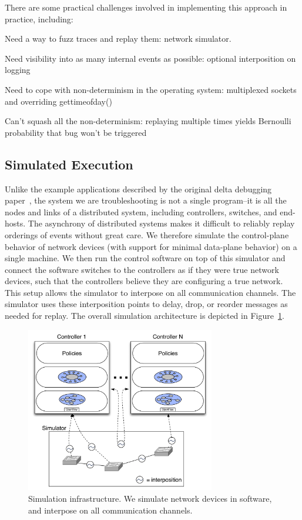 There are some practical challenges involved in implementing this approach in
practice, including:

\begin{outline}
\1 Need a way to fuzz traces and replay them: network simulator.

\1 Need visibility into as many internal events as possible: optional
interposition on logging

\1 Need to cope with non-determinism in the operating system: multiplexed sockets
and overriding gettimeofday()

\1 Can't squash all the non-determinism: replaying multiple times yields
Bernoulli probability that bug won't be triggered
\end{outline}

\subsection{Simulated Execution}
\label{subsec:simulation}

Unlike the example applications described
by the original delta debugging paper~\cite{Zeller:1999:YMP:318773.318946}, the system we are troubleshooting is not a
single program--it is all the nodes and links of a distributed system,
including controllers, switches, and end-hosts. The asynchrony of distributed
systems makes it difficult to reliably replay orderings of
events without great care. We therefore simulate the control-plane
behavior of network devices (with support for minimal data-plane behavior) on
a single machine. We then run the control software on
top of this simulator and connect the software switches to the controllers as if they were true
network devices, such that the controllers believe they are configuring a true
network. This setup allows the simulator to interpose on all communication
channels. The simulator uses these interposition points to delay, drop, or reorder
messages as needed for replay. The overall
simulation architecture is depicted in
Figure~\ref{fig:architecture}.

\begin{figure}[t]
    \includegraphics[width=3.25in]{../diagrams/architecture/Debugger_Architecture.pdf}
    \caption[]{\label{fig:architecture} Simulation infrastructure. We simulate
    network devices in software, and interpose on all communication
    channels.}
\end{figure}

